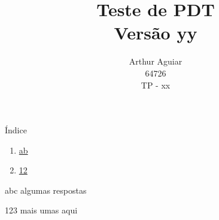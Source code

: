 \documentclass[11pt]{beamer}
\title{
	Teste de PDT \\
	Versão yy
}
\author{
		Arthur Aguiar \\
		64726 \\
		TP - xx
}
\begin{document}
	\maketitle

	\begin{frame}{Índice}
		\begin{enumerate}
			\item \hyperlink{lab1}{ab}
			\vskip 1cm
			\item \hyperlink{lab2}{12}
		\end{enumerate}
	\end{frame}


	\begin{frame}{abc}
		\label{lab1} algumas respostas
	\end{frame}

	\begin{frame}{123}
		\label{lab2} mais umas aqui
	\end{frame}
\end{document}
